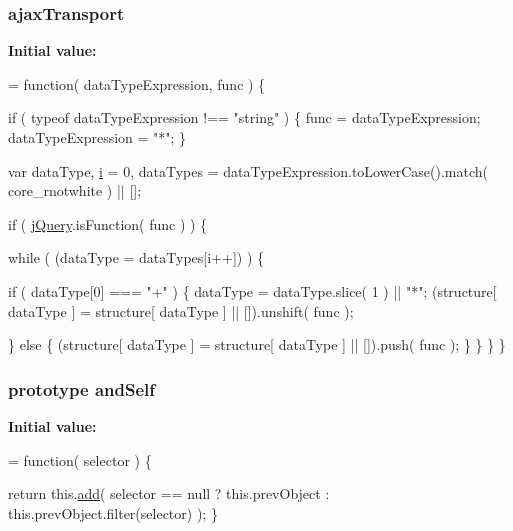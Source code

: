 \subsubsection[{ajax\+Transport}]{ ajax\+Transport}\label{jquery-1_810_82-vsdoc_8js_afe3900e3907689b52735b9c2bf0b8ff6}
{\bfseries Initial value\+:}
\begin{DoxyCode}
= \textcolor{keyword}{function}( dataTypeExpression, func ) \{


        \textcolor{keywordflow}{if} ( typeof dataTypeExpression !== \textcolor{stringliteral}{"string"} ) \{
            func = dataTypeExpression;
            dataTypeExpression = \textcolor{stringliteral}{"*"};
        \}

        var dataType,
            \hyperlink{_bibabook_2_scripts_2respond_8min_8js_a5e25b1d1bed9ab5f3174b76d6a722180}{i} = 0,
            dataTypes = dataTypeExpression.toLowerCase().match( core\_rnotwhite ) || [];

        \textcolor{keywordflow}{if} ( \hyperlink{jquery-1_810_82-vsdoc_8js_add5237586d970a38a81f990e8eb28c6c}{jQuery}.isFunction( func ) ) \{
            
            \textcolor{keywordflow}{while} ( (dataType = dataTypes[i++]) ) \{
                
                \textcolor{keywordflow}{if} ( dataType[0] === \textcolor{stringliteral}{"+"} ) \{
                    dataType = dataType.slice( 1 ) || \textcolor{stringliteral}{"*"};
                    (structure[ dataType ] = structure[ dataType ] || []).unshift( func );

                
                \} \textcolor{keywordflow}{else} \{
                    (structure[ dataType ] = structure[ dataType ] || []).push( func );
                \}
            \}
        \}
    \}
\end{DoxyCode}
\hypertarget{jquery-1_810_82-vsdoc_8js_a2f03fdae45ba09ba33b777405f66b0c4}{}
\subsubsection[{and\+Self}]{ {\bf prototype} and\+Self}\label{jquery-1_810_82-vsdoc_8js_a2f03fdae45ba09ba33b777405f66b0c4}
{\bfseries Initial value\+:}
\begin{DoxyCode}
= \textcolor{keyword}{function}( selector ) \{


        \textcolor{keywordflow}{return} this.\hyperlink{jquery-1_810_82-vsdoc_8js_a2f34e089948aad779d5a43c9b381caa6}{add}( selector == null ?
            this.prevObject : this.prevObject.filter(selector)
        );
    \}
\end{DoxyCode}
\hypertarget{jquery-1_810_82-vsdoc_8js_a956a1d08128d41115c45b6815814a64d}{}
